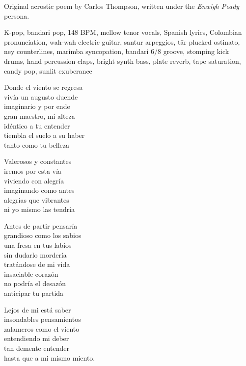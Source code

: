 
\begin{notes}
Original acrostic poem by Carlos Thompson, written under the \emph{Enwigh Peady} persona.
\end{notes}
\begin{style}
K-pop, bandari pop, 148 BPM, mellow tenor vocals, Spanish lyrics, Colombian pronunciation, wah-wah electric guitar, santur arpeggios, tār plucked ostinato, ney counterlines, marimba syncopation, bandari 6/8 groove, stomping kick drums, hand percussion claps, bright synth bass, plate reverb, tape saturation, candy pop, sunlit exuberance
\end{style}
\begin{lyrics}

Donde el viento se regresa\\
vivía un augusto duende\\
imaginario y por ende\\
gran maestro, mi alteza\\
idéntico a tu entender\\
tiembla el suelo a su haber\\
tanto como tu belleza


Valerosos y constantes\\
iremos por esta vía\\
viviendo con alegría\\
imaginando como antes\\
alegrías que vibrantes\\
ni yo mismo las tendría


Antes de partir pensaría\\
grandioso como los sabios\\
una fresa en tus labios\\
sin dudarlo mordería\\
tratándose de mi vida\\
insaciable corazón\\
no podría el desazón\\
anticipar tu partida


Lejos de mi está saber\\
insondables pensamientos\\
zalameros como el viento\\
entendiendo mi deber\\
tan demente entender\\
hasta que a mi mismo miento.
\end{lyrics}

